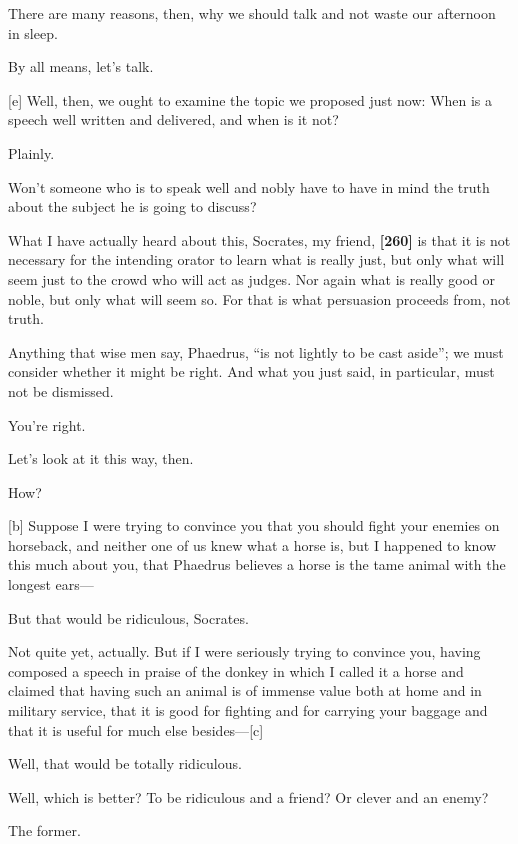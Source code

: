 There are many reasons, then, why we should talk and not waste our
afternoon in sleep.

\sayphaedrus By all means, let's talk.

{[}e{]} \saysocrates Well, then, we ought to examine the topic we proposed
just now: When is a speech well written and delivered, and when is it
not?

\sayphaedrus Plainly.

\saysocrates Won't someone who is to speak well and nobly have to have in
mind the truth about the subject he is going to discuss?

\sayphaedrus What I have actually heard about this, Socrates, my friend,
{\bf {[}260{]}} is that it is not necessary for the intending orator to
learn what is really just, but only what will seem just to the crowd who
will act as judges. Nor again what is really good or noble, but only
what will seem so. For that is what persuasion proceeds from, not truth.

\saysocrates Anything that wise men say, Phaedrus, “is not lightly to be
cast aside”; we must
consider whether it might be right. And what you just said, in
particular, must not be dismissed.

\sayphaedrus You're right.

\saysocrates Let's look at it this way, then.

\sayphaedrus How?

{[}b{]} \saysocrates Suppose I were trying to convince you that you should
fight your enemies on horseback, and neither one of us knew what a horse
is, but I happened to know this much about you, that Phaedrus believes a
horse is the tame animal with the longest ears---

\sayphaedrus But that would be ridiculous, Socrates.

\saysocrates Not quite yet, actually. But if I were seriously trying to
convince you, having composed a speech in praise of the donkey in which
I called it a horse and claimed that having such an animal is of immense
value both at home and in military service, that it is good for fighting
and for carrying your baggage and that it is useful for much else
besides---{[}c{]}

\sayphaedrus Well, that would be totally ridiculous.

\saysocrates Well, which is better? To be ridiculous and a friend? Or
clever and an enemy?

\sayphaedrus The former.

